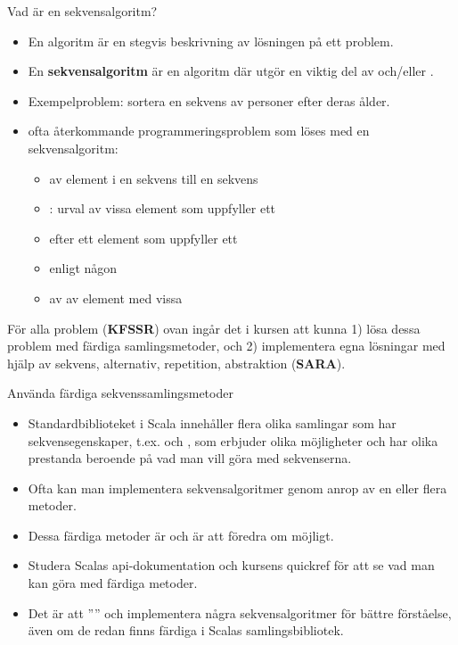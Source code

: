 \begin{Slide}{Vad är en sekvensalgoritm?}\SlideFontSmall
\begin{itemize}
\item En algoritm är en stegvis beskrivning av lösningen på ett problem.
\item En \textbf{sekvensalgoritm} är en algoritm där  utgör en viktig del av  och/eller .
\item Exempelproblem: sortera en sekvens av personer efter deras ålder.
\pause
\item {} ofta återkommande programmeringsproblem som löses med en sekvensalgoritm:
\begin{itemize}\SlideFontSmall
\item {} av  element i en sekvens till en  sekvens
\item {}: urval av vissa element som uppfyller ett 
\item {} efter ett element som uppfyller ett 
\item {} enligt någon 
\item {} av  av element med vissa 
\end{itemize}
\end{itemize}
\pause
För alla problem (\textbf{KFSSR}) ovan ingår det i kursen att kunna 1) lösa dessa problem med färdiga samlingsmetoder, och 2) implementera egna lösningar med hjälp av sekvens, alternativ, repetition, abstraktion (\textbf{SARA}).
\end{Slide}



\begin{Slide}{Använda färdiga sekvenssamlingsmetoder}
\begin{itemize}
\item Standardbiblioteket i Scala innehåller flera olika samlingar som har sekvensegenskaper, t.ex.  och , som erbjuder olika möjligheter och har olika prestanda beroende på vad man vill göra med sekvenserna.

\item Ofta kan man implementera sekvensalgoritmer genom anrop av en eller flera  metoder.

\item Dessa färdiga metoder är  och är att föredra om möjligt.

\item Studera Scalas api-dokumentation och kursens quickref för att se vad man kan göra med färdiga metoder.

\item Det är  att '''' och implementera några sekvensalgoritmer  för bättre förståelse, även om de redan finns färdiga i Scalas samlingsbibliotek.

\end{itemize}
\end{Slide}




